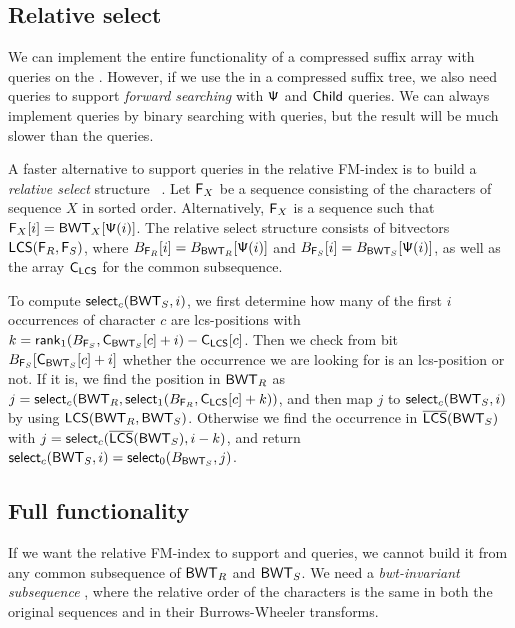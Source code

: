 \subsection{Relative select}

We can implement the entire functionality of a compressed suffix array with
\rank{} queries on the \BWT. However, if we use the \CSA{} in a compressed
suffix tree, we also need \select{} queries to support \emph{forward
searching} with $\mathsf{\Psi}$ and $\mathsf{Child}$ queries. We can always implement
\select{} queries by binary searching with \rank{} queries, but the result
will be much slower than the \rank{} queries.

A faster alternative to support \select{} queries in the relative FM-index
is to build a \emph{relative select} structure \rselect{}~\cite{Boucher2015}.
Let $\mathsf{F}_{X}$ be a sequence consisting of the characters of sequence $X$ in
sorted order. Alternatively, $\mathsf{F}_{X}$ is a sequence such that $\mathsf{F}_{X}[i] =
\mathsf{BWT}_{X}[\mathsf{\Psi}(i)]$. The relative select structure consists of bitvectors
$\mathsf{LCS}(\mathsf{F}_{R}, \mathsf{F}_{S})$, where $B_{\mathsf{F}_{R}}[i] = B_{\mathsf{BWT}_{R}}[\mathsf{\Psi}(i)]$ and
$B_{\mathsf{F}_{S}}[i] = B_{\mathsf{BWT}_{S}}[\mathsf{\Psi}(i)]$, as well as the \C{} array
$\mathsf{C}_{\mathsf{LCS}}$ for the common subsequence.

To compute $\mathsf{select}_{c}(\mathsf{BWT}_{S}, i)$, we first determine how many of
the first $i$ occurrences of character $c$ are lcs-positions with $k =
\mathsf{rank}_{1}(B_{\mathsf{F}_{S}}, \mathsf{C}_{\mathsf{BWT}_{S}}[c] + i) - \mathsf{C}_{\mathsf{LCS}}[c]$. Then we check
from bit $B_{\mathsf{F}_{S}}[\mathsf{C}_{\mathsf{BWT}_{S}}[c] + i]$ whether the occurrence we are
looking for is an lcs-position or not. If it is,
we find the position in $\mathsf{BWT}_{R}$ as $j = \mathsf{select}_{c}(\mathsf{BWT}_{R},
\mathsf{select}_{1}(B_{\mathsf{F}_{R}}, \mathsf{C}_{\mathsf{LCS}}[c] + k))$, and then map $j$ to
$\mathsf{select}_{c}(\mathsf{BWT}_{S}, i)$ by using $\mathsf{LCS}(\mathsf{BWT}_{R}, \mathsf{BWT}_{S})$. Otherwise we
find the occurrence in $\overline{ \mathsf{LCS} }(\mathsf{BWT}_{S})$ with $j = \mathsf{select}_{c}(\overline{ \mathsf{LCS} }(\mathsf{BWT}_{S}),
i-k)$, and return $\mathsf{select}_{c}(\mathsf{BWT}_{S}, i) = \mathsf{select}_{0}(B_{\mathsf{BWT}_{S}}, j)$.

\subsection{Full functionality}

If we want the relative FM-index to support \locate{} and \extract{} queries,
we cannot build it from any common subsequence of $\mathsf{BWT}_{R}$ and $\mathsf{BWT}_{S}$.
We need a \emph{bwt-invariant subsequence} \cite{Belazzougui2014}, where the
relative order of the characters is the same in both the original sequences
and in their Burrows-Wheeler transforms.

